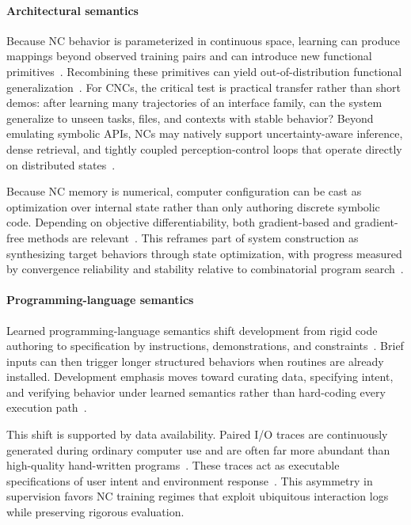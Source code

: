 \paragraph{Architectural semantics}
Because NC behavior is parameterized in continuous space, learning can produce mappings beyond observed training pairs and can introduce new functional primitives~\citep{poggio2019theoretical,ha2016hypernetworks}.
Recombining these primitives can yield out-of-distribution functional generalization~\citep{lake2018generalization}.
For CNCs, the critical test is practical transfer rather than short demos: after learning many trajectories of an interface family, can the system generalize to unseen tasks, files, and contexts with stable behavior?
Beyond emulating symbolic APIs, NCs may natively support uncertainty-aware inference, dense retrieval, and tightly coupled perception-control loops that operate directly on distributed states~\citep{marcus2018deep,kingma2013auto,bengio2013representation,graves2016hybrid,silver2017mastering,clements2019estimating,parisi2019continual}.

Because NC memory is numerical, computer configuration can be cast as optimization over internal state rather than only authoring discrete symbolic code.
Depending on objective differentiability, both gradient-based and gradient-free methods are relevant~\citep{adam2014method,wierstra2014natural}.
This reframes part of system construction as synthesizing target behaviors through state optimization, with progress measured by convergence reliability and stability relative to combinatorial program search~\citep{innes2019differentiable,hong2023metagpt}.

\paragraph{Programming-language semantics}
Learned programming-language semantics shift development from rigid code authoring to specification by instructions, demonstrations, and constraints~\citep{brown2020language,wei2022chain,ouyang2022training}.
Brief inputs can then trigger longer structured behaviors when routines are already installed.
Development emphasis moves toward curating data, specifying intent, and verifying behavior under learned semantics rather than hard-coding every execution path~\citep{austin2021program}.

This shift is supported by data availability.
Paired I/O traces are continuously generated during ordinary computer use and are often far more abundant than high-quality hand-written programs~\citep{flener2008introduction,yao2022webshop}.
These traces act as executable specifications of user intent and environment response~\citep{cypher1993watch,yao2022react}.
This asymmetry in supervision favors NC training regimes that exploit ubiquitous interaction logs while preserving rigorous evaluation.

